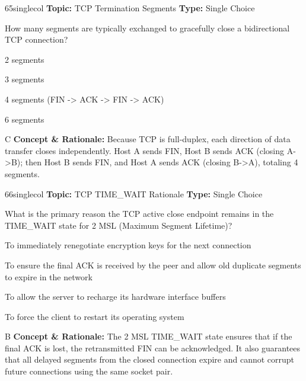 \begin{qcard}{65}{singlecol}
\textcolor{darkslate!75}{\small\textbf{Topic:} TCP Termination Segments \hfill \textbf{Type:} Single Choice}\vspace{0.4em}\par
How many segments are typically exchanged to gracefully close a bidirectional TCP connection?
\begin{qoptions}
\item 2 segments
\item 3 segments
\item 4 segments (FIN -\textgreater{} ACK -\textgreater{} FIN -\textgreater{} ACK)
\item 6 segments
\end{qoptions}
\end{qcard}
\nopagebreak
\begin{explainbox}{C}
\textbf{Concept \& Rationale:} Because TCP is full-duplex, each direction of data transfer closes independently. Host A sends FIN, Host B sends ACK (closing A-\textgreater{}B); then Host B sends FIN, and Host A sends ACK (closing B-\textgreater{}A), totaling 4 segments.
\end{explainbox}

\begin{qcard}{66}{singlecol}
\textcolor{darkslate!75}{\small\textbf{Topic:} TCP TIME\_WAIT Rationale \hfill \textbf{Type:} Single Choice}\vspace{0.4em}\par
What is the primary reason the TCP active close endpoint remains in the TIME\_WAIT state for 2 MSL (Maximum Segment Lifetime)?
\begin{qoptions}
\item To immediately renegotiate encryption keys for the next connection
\item To ensure the final ACK is received by the peer and allow old duplicate segments to expire in the network
\item To allow the server to recharge its hardware interface buffers
\item To force the client to restart its operating system
\end{qoptions}
\end{qcard}
\nopagebreak
\begin{explainbox}{B}
\textbf{Concept \& Rationale:} The 2 MSL TIME\_WAIT state ensures that if the final ACK is lost, the retransmitted FIN can be acknowledged. It also guarantees that all delayed segments from the closed connection expire and cannot corrupt future connections using the same socket pair.
\end{explainbox}

